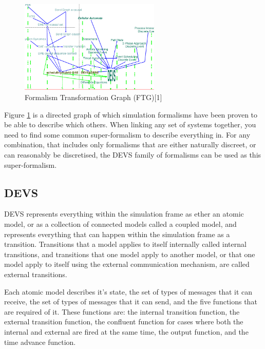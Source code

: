 \documentclass[twocolumn]{article}
\begin{document}
\begin{figure}[!ht]
	\begin{center}
		\includegraphics[width=18em]{Formalism-Transformation-Graph-FTG.png}
		\caption{Formalism Transformation Graph (FTG)[1]}
		\label{fig:ftg}
	\end{center}
\end{figure}


Figure \ref{fig:ftg} is a directed graph of which simulation formalisms have been proven to be able to describe which others. When linking any set of systems together, you need to find some common super-formalism to describe everything in. For any combination, that includes only formalisms that are either naturally discreet, or can reasonably be discretised, the DEVS family of formalisms can be used as this super-formalism.

\FloatBarrier

\subsection{DEVS}

DEVS represents everything within the simulation frame as ether an atomic model, or as a collection of connected models called a coupled model, and represents everything that can happen within the simulation frame as a transition. Transitions that a model applies to itself internally called internal transitions, and transitions that one model apply to another model, or that one model apply to itself using the external communication mechanism, are called external transitions.

Each atomic model describes it's state, the set of types of messages that it can receive, the set of types of messages that it can send, and the five functions that are required of it. These functions are: the internal transition function, the external transition function, the confluent function for cases where both the internal and external are fired at the same time, the output function, and the time advance function. 
\end{document}
